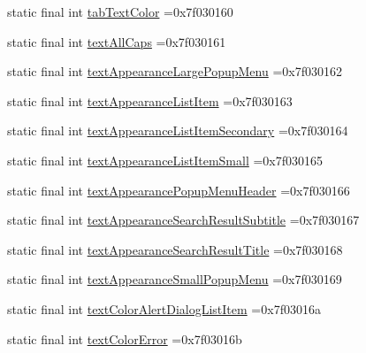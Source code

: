 \begin{DoxyCompactItemize}
\item 
static final int \mbox{\hyperlink{classbr_1_1unb_1_1cic_1_1mp_1_1marketmaster_1_1R_1_1attr_abbd894c3bfa76cacad45862a75e45673}{tab\+Text\+Color}} =0x7f030160
\item 
static final int \mbox{\hyperlink{classbr_1_1unb_1_1cic_1_1mp_1_1marketmaster_1_1R_1_1attr_a73205aea7ae5bb9de212c7dbcc4f5d01}{text\+All\+Caps}} =0x7f030161
\item 
static final int \mbox{\hyperlink{classbr_1_1unb_1_1cic_1_1mp_1_1marketmaster_1_1R_1_1attr_a8f8df95dfb1030803b30bfc3f830a2d3}{text\+Appearance\+Large\+Popup\+Menu}} =0x7f030162
\item 
static final int \mbox{\hyperlink{classbr_1_1unb_1_1cic_1_1mp_1_1marketmaster_1_1R_1_1attr_a39379c0c766c07f4a3cb324114573897}{text\+Appearance\+List\+Item}} =0x7f030163
\item 
static final int \mbox{\hyperlink{classbr_1_1unb_1_1cic_1_1mp_1_1marketmaster_1_1R_1_1attr_a045b29b1aac65b5bf407da78e746bf0f}{text\+Appearance\+List\+Item\+Secondary}} =0x7f030164
\item 
static final int \mbox{\hyperlink{classbr_1_1unb_1_1cic_1_1mp_1_1marketmaster_1_1R_1_1attr_abf49abec6f7058b40fcf1a79cc826c95}{text\+Appearance\+List\+Item\+Small}} =0x7f030165
\item 
static final int \mbox{\hyperlink{classbr_1_1unb_1_1cic_1_1mp_1_1marketmaster_1_1R_1_1attr_adc772b247194845e97d298d69175bc27}{text\+Appearance\+Popup\+Menu\+Header}} =0x7f030166
\item 
static final int \mbox{\hyperlink{classbr_1_1unb_1_1cic_1_1mp_1_1marketmaster_1_1R_1_1attr_add573418608a1fd6781985f843e50816}{text\+Appearance\+Search\+Result\+Subtitle}} =0x7f030167
\item 
static final int \mbox{\hyperlink{classbr_1_1unb_1_1cic_1_1mp_1_1marketmaster_1_1R_1_1attr_a067426526ad4e4db93140a44d98f26ba}{text\+Appearance\+Search\+Result\+Title}} =0x7f030168
\item 
static final int \mbox{\hyperlink{classbr_1_1unb_1_1cic_1_1mp_1_1marketmaster_1_1R_1_1attr_afb70fa144c5b4bd28e0f0187a5a425a7}{text\+Appearance\+Small\+Popup\+Menu}} =0x7f030169
\item 
static final int \mbox{\hyperlink{classbr_1_1unb_1_1cic_1_1mp_1_1marketmaster_1_1R_1_1attr_a9baea4447d156e50ae9f6c6c8f8207c1}{text\+Color\+Alert\+Dialog\+List\+Item}} =0x7f03016a
\item 
static final int \mbox{\hyperlink{classbr_1_1unb_1_1cic_1_1mp_1_1marketmaster_1_1R_1_1attr_a8163f1fe1c9219b9c74d2ae5d22d0f5e}{text\+Color\+Error}} =0x7f03016b

\end{DoxyCompactItemize}
